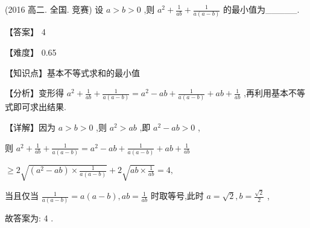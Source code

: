 \documentclass[11pt,a4paper]{article}
\begin{document}
\begin{hmwk} 
 (2016 高二. 全国. 竞赛) 设 \(\displaystyle a > b > 0\) ,则 \(\displaystyle {a}^{2} + \frac{1}{ab} + \frac{1}{a\left( {a - b}\right) }\) 的最小值为\_\_\_\_\_.

\begin{jiexi}
【答案】 4

【难度】 0.65

【知识点】基本不等式求和的最小值

【分析】变形得 \(\displaystyle {a}^{2} + \frac{1}{ab} + \frac{1}{a\left( {a - b}\right) } = {a}^{2} - {ab} + \frac{1}{a\left( {a - b}\right) } + {ab} + \frac{1}{ab}\) ,再利用基本不等式即可求出结果.

【详解】因为 \(\displaystyle a > b > 0\) ,则 \(\displaystyle {a}^{2} > {ab}\) ,即 \(\displaystyle {a}^{2} - {ab} > 0\) ,

则 \(\displaystyle {a}^{2} + \frac{1}{ab} + \frac{1}{a\left( {a - b}\right) } = {a}^{2} - {ab} + \frac{1}{a\left( {a - b}\right) } + {ab} + \frac{1}{ab}\)

\(\displaystyle \geq  2\sqrt{\left( {{a}^{2} - {ab}}\right)  \times  \frac{1}{a\left( {a - b}\right) }} + 2\sqrt{{ab} \times  \frac{1}{ab}} = 4,\)

当且仅当 \(\displaystyle \frac{1}{a\left( {a - b}\right) } = a\left( {a - b}\right) ,{ab} = \frac{1}{ab}\) 时取等号,此时 \(\displaystyle a = \sqrt{2},b = \frac{\sqrt{2}}{2}\) ,

故答案为: 4 .

\end{jiexi}
\end{hmwk}
\end{document}
